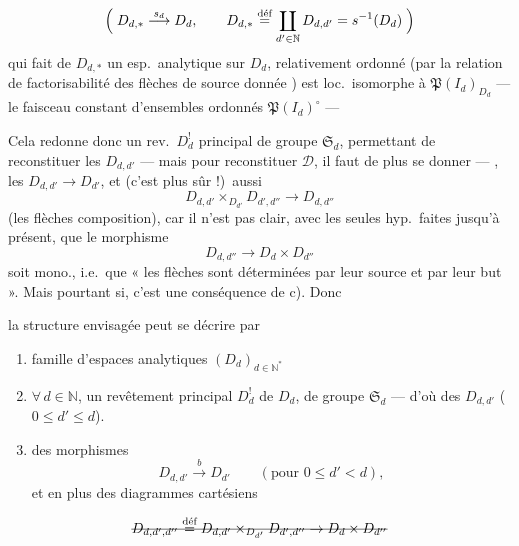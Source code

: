 \documentclass[11pt,a4paper]{article}
\begin{document}
\[
  \Bigl(\; D_{d,*} \overset{s_d}{\longrightarrow} D_d, \qquad
  D_{d,*} \overset{\text{déf}}{=} \coprod_{d'\in\mathbb{N}} D_{d,d'} = s^{-1}(D_d) \;\Bigr)
\]
qui fait de $D_{d,*}$ un esp.\ analytique sur $D_d$, \struck{\ill{}} relativement ordonné
(par la relation de factorisabilité des flèches de source donnée
)
est loc.\ isomorphe  à
$\mathfrak{P}(I_d)_{D_d}$ --- le faisceau constant d'ensembles ordonnés
 $\mathfrak{P}(I_d)^{\circ}$ ---

Cela redonne donc un rev.\ $D^{!}_d$ principal de groupe $\mathfrak{S}_d$, permettant
de reconstituer les $D_{d,d'}$ --- mais pour reconstituer $\mathcal{D}$, il faut de
plus se donner \struck{\ill{}} --- , les $D_{d,d'} \to D_{d'}$, et (c'est plus
sûr !)\ aussi
\[
  D_{d,d'} \times_{D_{d'}} D_{d',d''} \longrightarrow D_{d,d''}
\]
(les flèches composition), car il n'est pas clair, avec les seules hyp.\ faites
jusqu'à présent, que le morphisme
\[
  D_{d,d''} \longrightarrow D_d \times D_{d''}
\]
soit mono., i.e.\ que « les flèches sont déterminées par leur source et par leur
but ». Mais pourtant si, c'est une conséquence de c). Donc

la structure envisagée peut se décrire par
\begin{enumerate}
  \item[a)] famille d'espaces analytiques $(D_d)_{d\in\mathbb{N}^{*}}$
  \item[b)] $\forall\, d \in \mathbb{N}$, un revêtement principal $D^{!}_d$ de $D_d$, de
  groupe $\mathfrak{S}_d$ --- d'où des $D_{d,d'}$ ($0 \leq d' \leq d$).
  \item[c)] des morphismes
  \[
    D_{d,d'} \overset{b}{\longrightarrow} D_{d'} \qquad (\text{pour } 0 \leq d' < d),
  \]
  et en plus des diagrammes cartésiens
\end{enumerate}
\[
  \text{\struck{$D_{d,d',d''} \overset{\text{déf}}{=} D_{d,d'} \times_{D_{d'}} D_{d',d''} \to D_d \times D_{d''}$}}
\]
\end{document}
